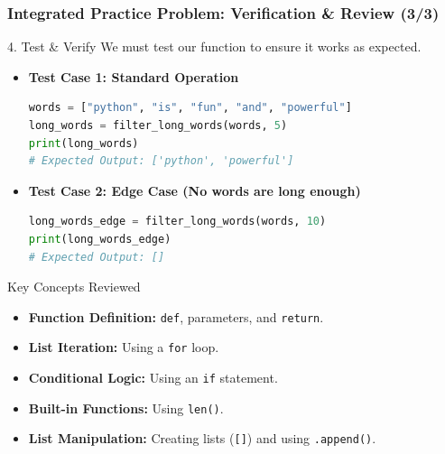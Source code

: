 \documentclass{beamer}
\begin{document}
\begin{frame}[fragile]
    \frametitle{Integrated Practice Problem: Verification \& Review (3/3)}

    \begin{block}{4. Test \& Verify}
        We must test our function to ensure it works as expected.
        \begin{itemize}
            \item \textbf{Test Case 1: Standard Operation}
            \begin{lstlisting}[language=Python, basicstyle=\small\ttfamily]
words = ["python", "is", "fun", "and", "powerful"]
long_words = filter_long_words(words, 5)
print(long_words)
# Expected Output: ['python', 'powerful']
            \end{lstlisting}
            \item \textbf{Test Case 2: Edge Case (No words are long enough)}
            \begin{lstlisting}[language=Python, basicstyle=\small\ttfamily]
long_words_edge = filter_long_words(words, 10)
print(long_words_edge)
# Expected Output: []
            \end{lstlisting}
        \end{itemize}
    \end{block}

    \begin{block}{Key Concepts Reviewed}
        \begin{itemize}
            \item \textbf{Function Definition:} \texttt{def}, parameters, and \texttt{return}.
            \item \textbf{List Iteration:} Using a \texttt{for} loop.
            \item \textbf{Conditional Logic:} Using an \texttt{if} statement.
            \item \textbf{Built-in Functions:} Using \texttt{len()}.
            \item \textbf{List Manipulation:} Creating lists (\texttt{[]}) and using \texttt{.append()}.
        \end{itemize}
    \end{block}
\end{frame}
\end{document}
